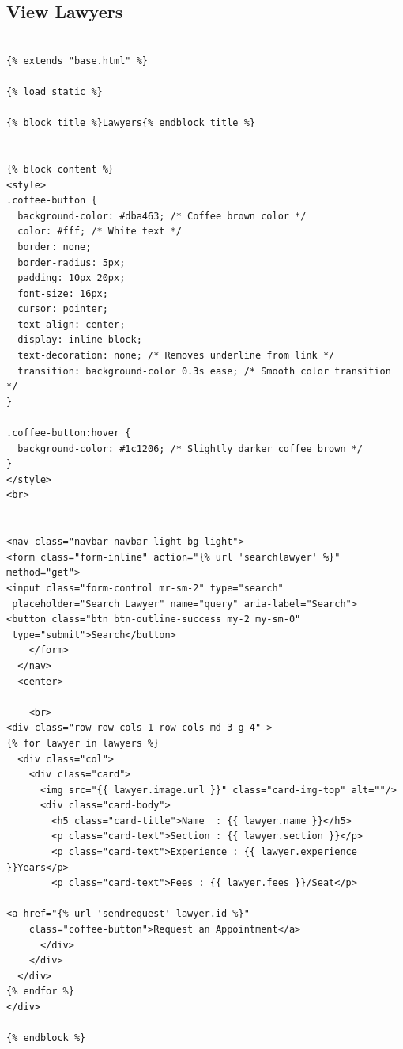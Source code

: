 \subsection{View Lawyers}
\begin{verbatim}

{% extends "base.html" %}

{% load static %}

{% block title %}Lawyers{% endblock title %}


{% block content %}
<style>
.coffee-button {
  background-color: #dba463; /* Coffee brown color */
  color: #fff; /* White text */
  border: none;
  border-radius: 5px;
  padding: 10px 20px;
  font-size: 16px;
  cursor: pointer;
  text-align: center;
  display: inline-block;
  text-decoration: none; /* Removes underline from link */
  transition: background-color 0.3s ease; /* Smooth color transition */
}

.coffee-button:hover {
  background-color: #1c1206; /* Slightly darker coffee brown */
}
</style>
<br>


<nav class="navbar navbar-light bg-light">
<form class="form-inline" action="{% url 'searchlawyer' %}" method="get">
<input class="form-control mr-sm-2" type="search"
 placeholder="Search Lawyer" name="query" aria-label="Search">
<button class="btn btn-outline-success my-2 my-sm-0"
 type="submit">Search</button>
    </form>
  </nav>
  <center>

    <br>
<div class="row row-cols-1 row-cols-md-3 g-4" >
{% for lawyer in lawyers %}
  <div class="col">
    <div class="card">
      <img src="{{ lawyer.image.url }}" class="card-img-top" alt=""/>
      <div class="card-body">
        <h5 class="card-title">Name  : {{ lawyer.name }}</h5>
        <p class="card-text">Section : {{ lawyer.section }}</p>
        <p class="card-text">Experience : {{ lawyer.experience }}Years</p>
        <p class="card-text">Fees : {{ lawyer.fees }}/Seat</p>
        
<a href="{% url 'sendrequest' lawyer.id %}" 
	class="coffee-button">Request an Appointment</a>
      </div>
    </div>
  </div>
{% endfor %}
</div>

{% endblock %}
\end{verbatim}
